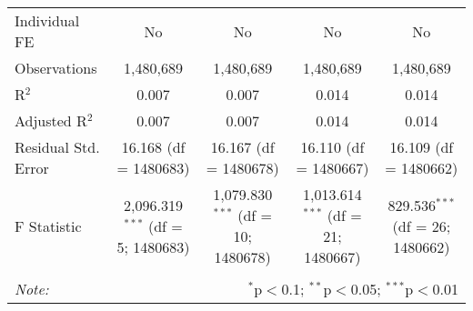\documentclass[
]{article}
\begin{document}
\begin{table}[!htbp]
{\begin{tabular}{@{\extracolsep{5pt}}lcccc}
Individual FE & No & No & No & No \\ 
Observations & 1,480,689 & 1,480,689 & 1,480,689 & 1,480,689 \\ 
R$^{2}$ & 0.007 & 0.007 & 0.014 & 0.014 \\ 
Adjusted R$^{2}$ & 0.007 & 0.007 & 0.014 & 0.014 \\ 
Residual Std. Error & 16.168 (df = 1480683) & 16.167 (df = 1480678) & 16.110 (df = 1480667) & 16.109 (df = 1480662) \\ 
F Statistic & 2,096.319$^{***}$ (df = 5; 1480683) & 1,079.830$^{***}$ (df = 10; 1480678) & 1,013.614$^{***}$ (df = 21; 1480667) & 829.536$^{***}$ (df = 26; 1480662) \\ 
\hline 
\hline \\[-1.8ex] 
\textit{Note:}  & \multicolumn{4}{r}{$^{*}$p$<$0.1; $^{**}$p$<$0.05; $^{***}$p$<$0.01} \\ 
\end{tabular}
} 
\end{table} 
\newpage
\end{document}
